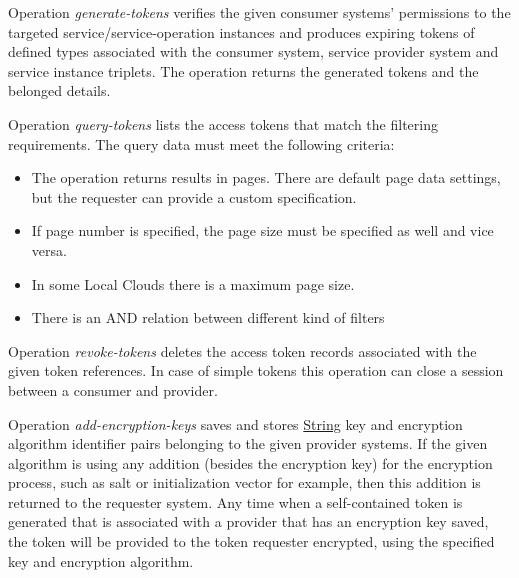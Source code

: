 \documentclass[a4paper]{arrowhead}
\newcommand{\pref}[1]{{\textcolor{ArrowheadGrey}{\hyperref[sec:model:primitives:#1]{#1}}}}
\begin{document}
Operation \textit{generate-tokens} verifies the given consumer systems' permissions to the targeted service/service-operation instances and produces expiring tokens of defined types associated with the consumer system, service provider system and  service instance triplets. The operation returns the generated tokens and the belonged details.


Operation \textit{query-tokens} lists the access tokens that match the filtering requirements. The query data must meet the following criteria:

\begin{itemize}
    \item The operation returns results in pages. There are default page data settings, but the requester can provide a custom specification.
    \item If page number is specified, the page size must be specified as well and vice versa.
    \item In some Local Clouds there is a maximum page size.
    \item There is an AND relation between different kind of filters
\end{itemize}


Operation \textit{revoke-tokens} deletes the access token records associated with the given token references. In case of simple tokens this operation can close a session between a consumer and provider.


Operation \textit{add-encryption-keys} saves and stores \pref{String} key and encryption algorithm identifier pairs belonging to the given provider systems. If the given algorithm is using any addition (besides the encryption key) for the encryption process, such as salt or initialization vector for example, then this addition is returned to the requester system. Any time when a self-contained token is generated that is associated with a provider that has an encryption key saved, the token will be provided to the token requester encrypted, using the specified key and encryption algorithm.

\end{document}
